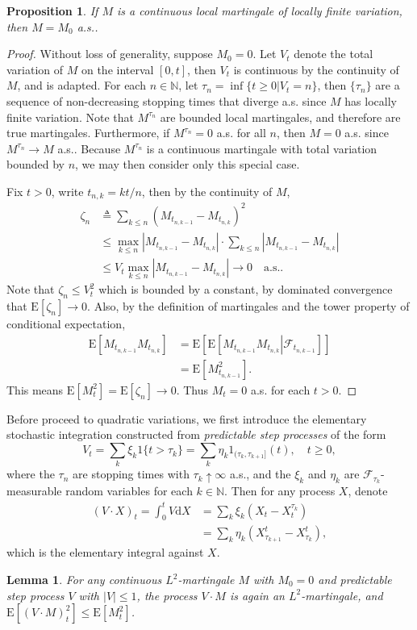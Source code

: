 \documentclass[10pt,twocolumn]{article}
\newtheorem{lemma}{Lemma}
\newtheorem{proposition}{Proposition}
\newcommand{\abs}[1]{\left|#1\right|}
\newcommand{\diff}[1]{\mathrm{d}#1}
\newcommand{\expect}[1]{\mathrm{E}\left[#1\right]}
\newcommand{\condexpect}[2]{\mathrm{E}\left[\left.#1\right|#2\right]}
\begin{document}
\begin{proposition}
	If $M$ is a continuous local martingale of locally finite variation, then $M=M_0$ a.s..
\end{proposition}
\begin{proof}
	Without loss of generality, suppose $M_0=0$.
	Let $V_t$ denote the total variation of $M$ on the interval $[0,t]$, then $V_t$ is continuous by the continuity of $M$, and is adapted.
	For each $n\in\mathbb{N}$, let $\tau_n = \inf\{t\geq0 | V_t=n\}$, then $\{\tau_n\}$ are a sequence of non-decreasing stopping times that diverge a.s. since $M$ has locally finite variation.
	Note that $M^{\tau_n}$ are bounded local martingales, and therefore are true martingales.
	Furthermore, if $M^{\tau_n} = 0$ a.s. for all $n$, then $M=0$ a.s. since $M^{\tau_n} \to M$ a.s..
	Because $M^{\tau_n}$ is a continuous martingale with total variation bounded by $n$, we may then consider only this special case.
	
	Fix $t>0$, write $t_{n,k} = kt/n$, then by the continuity of $M$,
	\begin{align*}
		\zeta_n &\triangleq \sum_{k \leq n} (M_{t_{n,k-1}}-M_{t_{n,k}})^2 \\
		&\leq \max_{k \leq n} \abs{M_{t_{n,k-1}}-M_{t_{n,k}}} \cdot \sum_{k \leq n} \abs{M_{t_{n,k-1}}-M_{t_{n,k}}} \\
		&\leq V_t \max_{k \leq n} \abs{M_{t_{n,k-1}}-M_{t_{n,k}}} \to 0 \quad \text{a.s.}.
	\end{align*}
	Note that $\zeta_n \leq V_t^2$ which is bounded by a constant, by dominated convergence that $\expect{\zeta_n} \to 0$.
	Also, by the definition of martingales and the tower property of conditional expectation,
	\begin{align*}
		\expect{M_{t_{n,k-1}}M_{t_{n,k}}} &= \expect{\condexpect{M_{t_{n,k-1}}M_{t_{n,k}}}{\mathcal{F}_{t_{n,k-1}}}} \\
		&= \expect{M_{t_{n,k-1}}^2}.
	\end{align*}
	This means $\expect{M_t^2} = \expect{\zeta_n} \to 0$.
	Thus $M_t=0$ a.s. for each $t>0$.
\end{proof}

Before proceed to quadratic variations, we first introduce the elementary stochastic integration constructed from \textit{predictable step processes} of the form
\begin{equation}
	V_t = \sum_{k}\xi_k 1\{t>\tau_k\} = \sum_{k}\eta_k 1_{(\tau_k,\tau_{k+1}]}(t), \quad t\geq0,
\end{equation}
where the $\tau_n$ are stopping times with $\tau_k \uparrow \infty$ a.s., and the $\xi_k$ and $\eta_k$ are $\mathcal{F}_{\tau_k}$-measurable random variables for each $k\in\mathbb{N}$.
Then for any process $X$, denote
\begin{align}
	(V \cdot X)_t = \int_0^t V\diff{X} &= \sum_k \xi_k(X_t-X_t^{\tau_k}) \nonumber \\
	&= \sum_k \eta_k (X_{\tau_{k+1}}^t-X_{\tau_k}^t),
\end{align}
which is the elementary integral against $X$.

\begin{lemma}
	For any continuous $L^2$-martingale $M$ with $M_0=0$ and predictable step process $V$ with $\abs{V}\leq1$, the process $V \cdot M$ is again an $L^2$-martingale, and $\expect{(V \cdot M)_t^2} \leq \expect{M_t^2}$.
\end{lemma}
\end{document}
